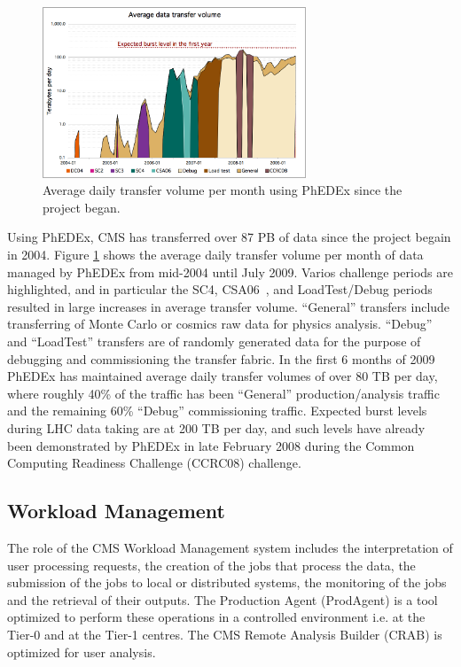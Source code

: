 \begin{figure}
 \includegraphics[width=0.70\textwidth]{figures/phedex-avg-monthly-volume.png}
\caption{Average daily transfer volume per month using PhEDEx since the project began.}
\label{fig:phedex-transfers}
\end{figure}

Using PhEDEx, CMS has transferred over 87 PB of data since the project
begain in 2004.  Figure \ref{fig:phedex-transfers} shows the average
daily transfer volume per month of data managed by PhEDEx from
mid-2004 until July 2009.  Varios challenge periods are highlighted,
and in particular the SC4, CSA06~\cite{RefPastExp}, and LoadTest/Debug periods resulted
in large increases in average transfer volume.  ``General'' transfers
include transferring of Monte Carlo or cosmics raw data for physics
analysis.  ``Debug'' and ``LoadTest'' transfers are of randomly
generated data for the purpose of debugging and commissioning the
transfer fabric.  In the first 6 months of 2009 PhEDEx has maintained
average daily transfer volumes of over 80 TB per day, where roughly
40\% of the traffic has been ``General'' production/analysis traffic
and the remaining 60\% ``Debug'' commissioning traffic.  Expected
burst levels during LHC data taking are at 200 TB per day, and such
levels have already been demonstrated by PhEDEx in late February 2008
during the Common Computing Readiness Challenge (CCRC08) challenge.

\subsection{Workload Management}
The role of the CMS Workload Management system includes the interpretation of user processing requests, the creation of the jobs that process the data, the submission of the jobs to local or distributed systems, the monitoring of the jobs and the retrieval of their outputs. The Production Agent (ProdAgent)\cite{RefPA} is a tool optimized to perform these operations in a controlled environment i.e. at the Tier-0 and at the Tier-1 centres. The CMS Remote Analysis Builder (CRAB) is optimized for user analysis.

